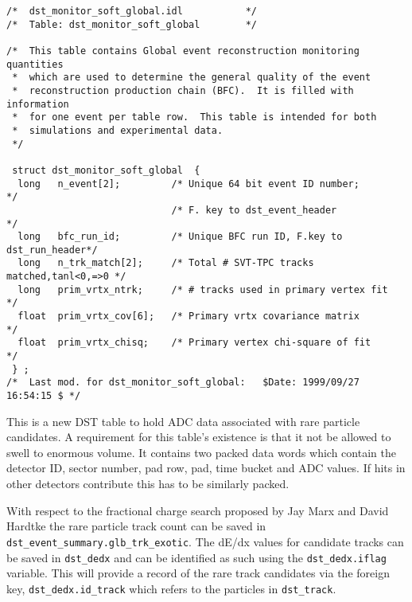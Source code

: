 \begin{verbatim}
/*  dst_monitor_soft_global.idl           */
/*  Table: dst_monitor_soft_global        */

/*  This table contains Global event reconstruction monitoring quantities
 *  which are used to determine the general quality of the event
 *  reconstruction production chain (BFC).  It is filled with information
 *  for one event per table row.  This table is intended for both
 *  simulations and experimental data.
 */

 struct dst_monitor_soft_global  {
  long   n_event[2];         /* Unique 64 bit event ID number;            */
                             /* F. key to dst_event_header                */
  long   bfc_run_id;         /* Unique BFC run ID, F.key to dst_run_header*/
  long   n_trk_match[2];     /* Total # SVT-TPC tracks matched,tanl<0,=>0 */
  long   prim_vrtx_ntrk;     /* # tracks used in primary vertex fit       */
  float  prim_vrtx_cov[6];   /* Primary vrtx covariance matrix            */
  float  prim_vrtx_chisq;    /* Primary vertex chi-square of fit          */
 } ;
/*  Last mod. for dst_monitor_soft_global:   $Date: 1999/09/27 16:54:15 $ */

\end{verbatim}

\vspace{0.1in}
\vspace{0.05in}

This is a new DST table to hold ADC data associated with rare particle
candidates.  A requirement for this table's existence is that it not be allowed
to swell to enormous volume.  It contains two packed data words which
contain the detector ID, sector number, pad row, pad, time bucket and ADC
values.  If hits in other detectors contribute this has to be similarly packed.

With respect to the fractional charge search proposed by Jay Marx and David
Hardtke
the rare particle track count can be saved in
{\tt dst\_event\_summary.glb\_trk\_exotic}.  The  dE/dx values for candidate
tracks can be saved in {\tt dst\_dedx} and can be identified as such using
the {\tt dst\_dedx.iflag} variable.  This will provide a record of the 
rare track candidates via the foreign key, {\tt dst\_dedx.id\_track} which
refers to the particles in {\tt dst\_track}.

